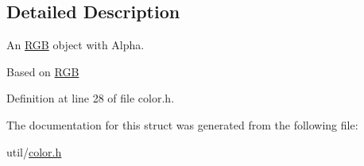 \subsection{Detailed Description}
An \hyperlink{struct_tri_1_1_util_1_1_r_g_b}{R\+G\+B} object with Alpha. 

Based on \hyperlink{struct_tri_1_1_util_1_1_r_g_b}{R\+G\+B} 

Definition at line 28 of file color.\+h.



The documentation for this struct was generated from the following file\+:\begin{DoxyCompactItemize}
\item 
util/\hyperlink{color_8h}{color.\+h}\end{DoxyCompactItemize}
